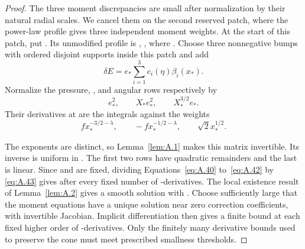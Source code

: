 \begin{proof}
The three moment discrepancies are small after normalization by their natural radial scales. We cancel them on the second
reserved patch, where the power-law profile gives three independent moment weights. At the start
 of this patch, put . Its unmodified profile is
, , where
. Choose three nonnegative bumps
 with ordered disjoint supports inside this patch and add
\[
  \delta E=e_*\sum_{i=1}^3c_i(\eta)\beta_i(x_*).
\]
Normalize the pressure, , and angular rows respectively by
\begin{equation}
  e_*^2,\qquad X_*e_*^2,\qquad X_*^{3/2}e_*.
  \tag{A.43}\label{eq:A.43}
\end{equation}
Their derivatives at  are the integrals against the weights
\[
  fx_*^{-3/2-\lambda},\qquad -fx_*^{-1/2-\lambda},\qquad \sqrt{2}x_*^{1/2}.
\]

%
The exponents are distinct, so Lemma~\ref{lem:A.1} makes this matrix invertible. Its inverse is uniform in
. The first two rows have quadratic remainders and the last is linear. Since
 and  are fixed, dividing
Equations~\eqref{eq:A.40} to~\eqref{eq:A.42} by \eqref{eq:A.43} gives
 after every fixed number of -derivatives. The local existence
result of Lemma~\ref{lem:A.2} gives a smooth solution with
. Choose
 sufficiently large that the moment equations have a unique solution near zero correction
coefficients, with invertible Jacobian. Implicit differentiation then gives a finite bound at each fixed higher order of
-derivatives. Only the finitely many derivative bounds used to preserve the cone must meet prescribed
smallness thresholds.


\end{proof}
